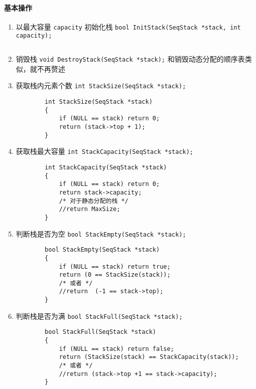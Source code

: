 \documentclass{ctexart}
\begin{document}
\paragraph{基本操作}
\begin{enumerate}
    \item 以最大容量 \texttt{capacity} 初始化栈 \texttt{bool InitStack(SeqStack *stack, int capacity);}
        \inputminted{c}{codes/init-sequence-stack.c}

    \item 销毁栈 \texttt{void DestroyStack(SeqStack *stack);} 和销毁动态分配的顺序表类似，就不再赘述

    \item 获取栈内元素个数 \texttt{int StackSize(SeqStack *stack);}
        \begin{verbatim}
        int StackSize(SeqStack *stack)
        {
            if (NULL == stack) return 0;
            return (stack->top + 1);
        }
        \end{verbatim}

    \item 获取栈最大容量 \texttt{int StackCapacity(SeqStack *stack);}
        \begin{verbatim}
        int StackCapacity(SeqStack *stack)
        {
            if (NULL == stack) return 0;
            return stack->capacity;
            /* 对于静态分配的栈 */
            //return MaxSize;
        }
        \end{verbatim}

    \item 判断栈是否为空 \texttt{bool StackEmpty(SeqStack *stack);}
        \begin{verbatim}
        bool StackEmpty(SeqStack *stack)
        {
            if (NULL == stack) return true;
            return (0 == StackSize(stack));
            /* 或者 */
            //return  (-1 == stack->top);
        }
        \end{verbatim}

    \item 判断栈是否为满 \texttt{bool StackFull(SeqStack *stack);}
        \begin{verbatim}
        bool StackFull(SeqStack *stack)
        {
            if (NULL == stack) return false;
            return (StackSize(stack) == StackCapacity(stack));
            /* 或者 */
            //return (stack->top +1 == stack->capacity);
        }
        \end{verbatim}


\end{enumerate}
\end{document}
